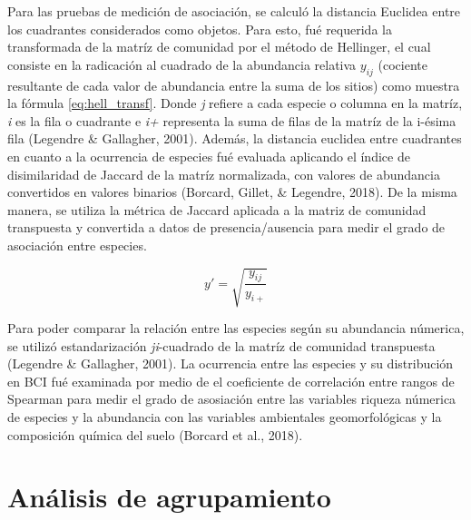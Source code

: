 \documentclass[11pt,]{article}
\begin{document}
Para las pruebas de medición de asociación, se calculó la distancia
Euclidea entre los cuadrantes considerados como objetos. Para esto, fué
requerida la transformada de la matríz de comunidad por el método de
Hellinger, el cual consiste en la radicación al cuadrado de la
abundancia relativa \(y_{ij}\) (cociente resultante de cada valor de
abundancia entre la suma de los sitios) como muestra la fórmula
\ref{eq:hell_transf}. Donde \emph{j} refiere a cada especie o columna en
la matríz, \emph{i} es la fila o cuadrante e \emph{i+} representa la
suma de filas de la matríz de la i-ésima fila (Legendre \& Gallagher,
2001). Además, la distancia euclidea entre cuadrantes en cuanto a la
ocurrencia de especies fué evaluada aplicando el índice de disimilaridad
de Jaccard de la matríz normalizada, con valores de abundancia
convertidos en valores binarios (Borcard, Gillet, \& Legendre, 2018). De
la misma manera, se utiliza la métrica de Jaccard aplicada a la matriz
de comunidad transpuesta y convertida a datos de presencia/ausencia para
medir el grado de asociación entre especies.

\begin{equation} \label{eq:hell_transf}
y' = \sqrt{\frac{y_{ij}}{y_{i+}}}
\end{equation}

Para poder comparar la relación entre las especies según su abundancia
númerica, se utilizó estandarización \emph{ji}-cuadrado de la matríz de
comunidad transpuesta (Legendre \& Gallagher, 2001). La ocurrencia entre
las especies y su distribución en BCI fué examinada por medio de el
coeficiente de correlación entre rangos de Spearman para medir el grado
de asosiación entre las variables riqueza númerica de especies y la
abundancia con las variables ambientales geomorfológicas y la
composición química del suelo (Borcard et al., 2018).

\section{Análisis de agrupamiento}\label{anuxe1lisis-de-agrupamiento}
\end{document}
